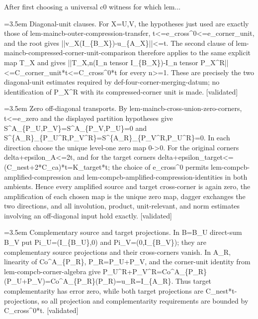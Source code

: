 \documentclass{article}
\newcommand{\step}[1]{\par\noindent\hangindent=3.5em\hangafter=1%
  \makebox[3.5em][l]{\textbf{#1.}}}
\newcommand{\steptag}[1]{\hfill{\small\textsf{[#1]}}}
\begin{document}
\begin{proofbox}{After first choosing a universal c0 witness for which lem...}
\step{1.5} Diagonal-unit clauses. For X=U,V, the hypotheses just used are exactly those of lem-maincb-outer-compression-transfer, t<=e\_cross\textasciicircum{}0<=e\_corner\_unit, and the root gives ||v\_X(I\_\{B\_X\})-u\_\{A\_X\}||<=t. The second clause of lem-maincb-compressed-corner-unit-comparison therefore applies to the same explicit map T\_X and gives ||T\_X,n(I\_n tensor I\_\{B\_X\})-I\_n tensor P\_X\textasciicircum{}R||<=C\_corner\_unit*t<=C\_cross\textasciicircum{}0*t for every n>=1. These are precisely the two diagonal-unit estimates required by def-four-corner-merging-datum; no identification of P\_X\textasciicircum{}R with its compressed-corner unit is made. \steptag{validated} \\[4pt]
\step{1.6} Zero off-diagonal transports. By lem-maincb-cross-union-zero-corners, t<=e\_zero and the displayed partition hypotheses give S\textasciicircum{}A\_\{P\_U,P\_V\}=S\textasciicircum{}A\_\{P\_V,P\_U\}=0 and S\textasciicircum{}\{A\_R\}\_\{P\_U\textasciicircum{}R,P\_V\textasciicircum{}R\}=S\textasciicircum{}\{A\_R\}\_\{P\_V\textasciicircum{}R,P\_U\textasciicircum{}R\}=0. In each direction choose the unique level-one zero map 0->0. For the original corners delta+epsilon\_A<=2t, and for the target corners delta+epsilon\_target<=(C\_nest+2*C\_ca)*t=K\_target*t; the choice of e\_cross\textasciicircum{}0 permits lem-compcb-amplified-compression and lem-compcb-amplified-compression-identities in both ambients. Hence every amplified source and target cross-corner is again zero, the amplification of each chosen map is the unique zero map, dagger exchanges the two directions, and all involution, product, unit-relevant, and norm estimates involving an off-diagonal input hold exactly. \steptag{validated} \\[4pt]
\step{1.7} Complementary source and target projections. In B=B\_U direct-sum B\_V put Pi\_U=(I\_\{B\_U\},0) and Pi\_V=(0,I\_\{B\_V\}); they are complementary source projections and their cross-corners vanish. In A\_R, linearity of Co\textasciicircum{}A\_\{P\_R\}, P\_R=P\_U+P\_V, and the corner-unit identity from lem-compcb-corner-algebra give P\_U\textasciicircum{}R+P\_V\textasciicircum{}R=Co\textasciicircum{}A\_\{P\_R\}(P\_U+P\_V)=Co\textasciicircum{}A\_\{P\_R\}(P\_R)=u\_R=I\_\{A\_R\}. Thus target complementarity has error zero, while both target projections are C\_nest*t-projections, so all projection and complementarity requirements are bounded by C\_cross\textasciicircum{}0*t. \steptag{validated} \\[4pt]

\end{proofbox}
\end{document}
